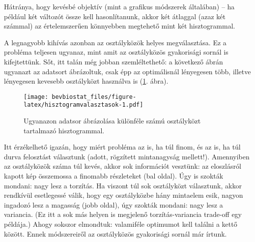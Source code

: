 \documentclass[]{book}
\newenvironment{Shaded}{\begin{snugshade}}{\end{snugshade}}
\newcommand{\KeywordTok}[1]{\textcolor[rgb]{0.13,0.29,0.53}{\textbf{#1}}}
\newcommand{\DataTypeTok}[1]{\textcolor[rgb]{0.13,0.29,0.53}{#1}}
\newcommand{\DecValTok}[1]{\textcolor[rgb]{0.00,0.00,0.81}{#1}}
\newcommand{\StringTok}[1]{\textcolor[rgb]{0.31,0.60,0.02}{#1}}
\newcommand{\OperatorTok}[1]{\textcolor[rgb]{0.81,0.36,0.00}{\textbf{#1}}}
\newcommand{\NormalTok}[1]{#1}
\begin{document}
Hátránya, hogy kevésbé objektív (mint a grafikus módszerek általában) --
ha például két változót össze kell hasonlítanunk, akkor két átlaggal
(azaz két számmal) az értelemszerűen könnyebben megtehető mint két
hisztogrammal.

A legnagyobb kihívás azonban az osztályközök helyes megválasztása. Ez a
probléma teljesen ugyanaz, mint amit az osztályközös gyakorisági sornál
is kifejtettünk. Sőt, itt talán még jobban szemléltethető: a következő
ábrán ugyanazt az adatsort ábrázoltuk, csak épp az optimálisnál
lényegesen több, illetve lényegesen kevesebb osztályközt használva is
(\ref{fig:hisztogramvalasztasok}. ábra).

\begin{Shaded}
\end{Shaded}

\begin{figure}
\centering
\texttt{[image: bevbiostat\_files/figure-latex/hisztogramvalasztasok-1.pdf]}
\caption{\label{fig:hisztogramvalasztasok}Ugyanazon adatsor ábrázolása
különféle számú osztályközt tartalmazó hisztogrammal.}
\end{figure}

Itt érzékelhető igazán, hogy miért probléma az is, ha túl finom, és az
is, ha túl durva felosztást választunk (adott, rögzített mintanagyság
mellett!). Amennyiben az osztályközök száma túl kevés, akkor sok
információt vesztünk: az eloszlásról kapott kép összemossa a finomabb
részleteket (bal oldal). Úgy is szokták mondani: nagy lesz a torzítás.
Ha viszont túl sok osztályközt választunk, akkor rendkívül esetlegessé
válik, hogy egy osztályközbe hány mintaelem esik, nagyon ingadozó lesz a
magasság (jobb oldal), úgy szokták mondani: nagy lesz a variancia. (Ez
itt a sok más helyen is megjelenő torzítás-variancia trade-off egy
példája.) Ahogy sokszor elmondtuk: valamiféle optimumot kell találni a
kettő között. Ennek módszereiről az osztályközös gyakorisági sornál már
írtunk.
\end{document}
